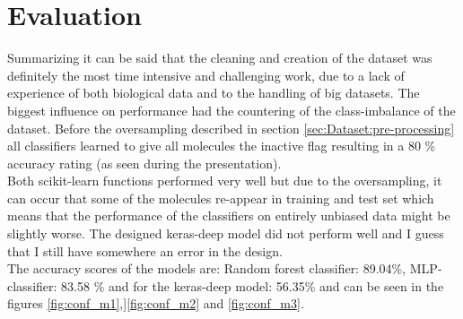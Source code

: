 \documentclass[12pt]{article}
\begin{document}
\section{Evaluation}\label{sec:Evaluation}
Summarizing it can be said that the cleaning and creation of the dataset was definitely the most time intensive and challenging work, due to a lack of experience of both biological data and to the handling of big datasets. The biggest influence on performance had the countering of the class-imbalance of the dataset. Before the oversampling described in section \ref{sec:Dataset:pre-processing} all classifiers learned to give all molecules the inactive flag resulting in a 80 \% accuracy rating (as seen during the presentation).\\
%
Both scikit-learn functions performed very well but due to the oversampling, it can occur that some of the molecules re-appear in training and test set which means that the performance of the classifiers on entirely unbiased data might be slightly worse. The designed keras-deep model did not perform well and I guess that I still have somewhere an error in the design.\\ The accuracy scores of the models are: Random forest classifier: 89.04\%, MLP-classifier: 83.58 \% and for the keras-deep model: 56.35\% and can be seen in the figures \ref{fig:conf_m1},]\ref{fig:conf_m2} and \ref{fig:conf_m3}.
\end{document}
